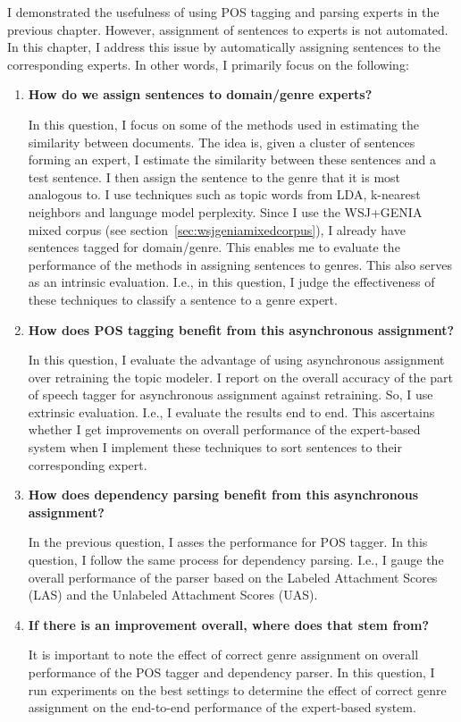 I demonstrated the usefulness of using POS tagging and parsing experts in the previous chapter. However, assignment of sentences to experts is not automated. In this chapter, I address this issue by automatically assigning sentences to the corresponding experts. In other words, I primarily focus on the following:
\begin{enumerate} [label=\textbf{Question \arabic*:},align=left]

    \item \textbf{How do we assign sentences to domain/genre experts?}
    
    In this question, I focus on some of the methods used in estimating the similarity between documents. The idea is, given a cluster of sentences forming an expert, I estimate the similarity between these sentences and a test sentence. I then assign the sentence to the genre that it is most analogous to. I use techniques such as topic words from LDA, k-nearest neighbors and language model perplexity. Since I use the WSJ+GENIA mixed corpus (see section~\ref{sec:wsjgeniamixedcorpus}), I already have sentences tagged for domain/genre. This enables me to evaluate the performance of the methods in assigning sentences to genres. This also serves as an intrinsic evaluation. I.e., in this question, I judge the effectiveness of these techniques to classify a sentence to a genre expert.
    
    \item \textbf{How does POS tagging benefit from this asynchronous assignment?}
    
    In this question, I evaluate the advantage of using asynchronous assignment over retraining the topic modeler. I report on the overall accuracy of the part of speech tagger for asynchronous assignment against retraining. So, I use extrinsic evaluation. I.e., I evaluate the results end to end. This ascertains whether I get improvements on overall performance of the expert-based system when I implement these techniques to sort sentences to their corresponding expert.
    
    \item \textbf{How does dependency parsing benefit from this asynchronous assignment?}
    
    In the previous question, I asses the performance for POS tagger. In this question, I follow the same process for dependency parsing. I.e., I gauge the overall performance of the parser based on the Labeled Attachment Scores (LAS) and the Unlabeled Attachment Scores (UAS).
    
    \item \textbf{If there is an improvement overall, where does that stem from?}
    
    It is important to note the effect of correct genre assignment on overall performance of the POS tagger and dependency parser. In this question, I run experiments on the best settings to determine the effect of correct genre assignment on the end-to-end performance of the expert-based system. 



\end{enumerate}




